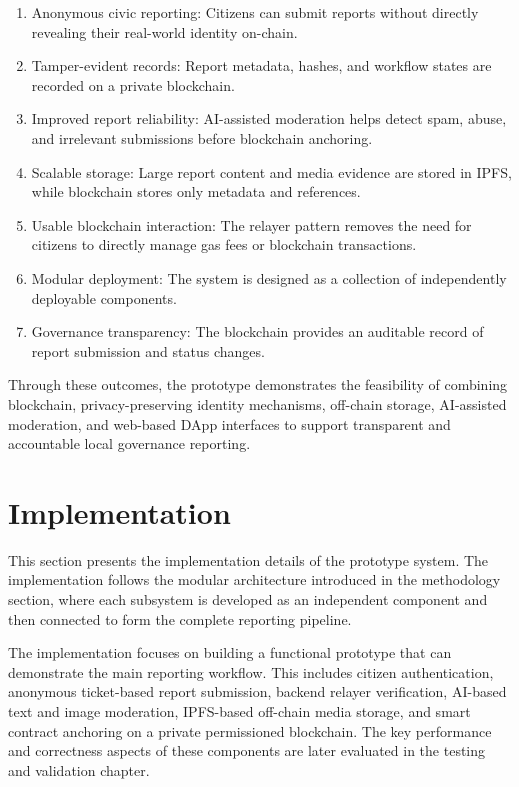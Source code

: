 \begin{enumerate}
    \item  Anonymous civic reporting:
Citizens can submit reports without directly revealing their real-world identity on-chain.
    \item Tamper-evident records:
Report metadata, hashes, and workflow states are recorded on a private blockchain.
    \item Improved report reliability:
AI-assisted moderation helps detect spam, abuse, and irrelevant submissions before blockchain anchoring.
    \item Scalable storage:
Large report content and media evidence are stored in IPFS, while blockchain stores only metadata and references.
    \item Usable blockchain interaction:
The relayer pattern removes the need for citizens to directly manage gas fees or blockchain transactions.
    \item Modular deployment:
The system is designed as a collection of independently deployable components.
    \item 
Governance transparency:
The blockchain provides an auditable record of report submission and status changes.
 
\end{enumerate}


Through these outcomes, the prototype demonstrates the feasibility of combining blockchain, privacy-preserving identity mechanisms, off-chain storage, AI-assisted moderation, and web-based DApp interfaces to support transparent and accountable local governance reporting.



\section{Implementation}

This section presents the implementation details of the prototype system. The implementation follows the modular architecture introduced in the methodology section, where each subsystem is developed as an independent component and then connected to form the complete reporting pipeline.

The implementation focuses on building a functional prototype that can demonstrate the main reporting workflow. This includes citizen authentication, anonymous ticket-based report submission, backend relayer verification, AI-based text and image moderation, IPFS-based off-chain media storage, and smart contract anchoring on a private permissioned blockchain. The key performance and correctness aspects of these components are later evaluated in the testing and validation chapter.

